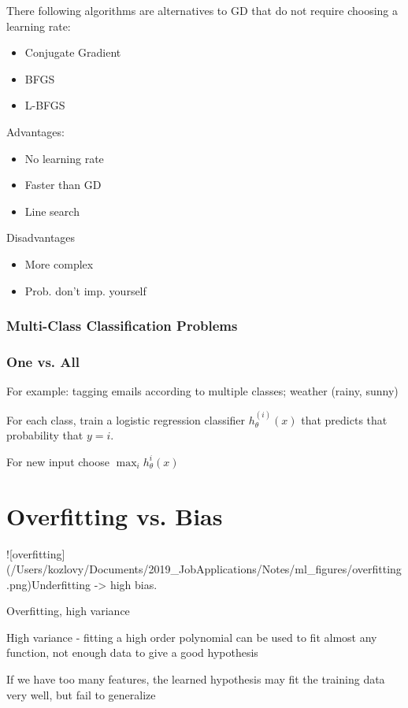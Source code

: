 {{{{There following algorithms are alternatives to GD that do not require choosing a learning rate:

\begin{itemize}
\item Conjugate Gradient
\item BFGS
\item L-BFGS
\end{itemize}

Advantages:
\begin{itemize}
\item No learning rate
\item Faster than GD
\item Line search
\end{itemize}

Disadvantages
\begin{itemize}
\item More complex
\item Prob. don't imp. yourself
\end{itemize}

\subsubsection{Multi-Class Classification Problems}

\subsubsection{One vs. All}

For example: tagging emails according to multiple classes; weather (rainy, sunny)

For each class, train a logistic regression classifier $h_{\theta}^{(i)}(x)$ that predicts that probability that $y=i$.

For new input choose $\max_ih_\theta^i(x)$

\section{ Overfitting vs. Bias}

![overfitting](/Users/kozlovy/Documents/2019_JobApplications/Notes/ml_figures/overfitting.png)Underfitting -> high bias. 

Overfitting, high variance

High variance - fitting a high order polynomial can be used to fit almost any function, not enough data to give a good hypothesis

\item If we have too many features, the learned hypothesis may fit the training data very well, but fail to generalize

}}}}
